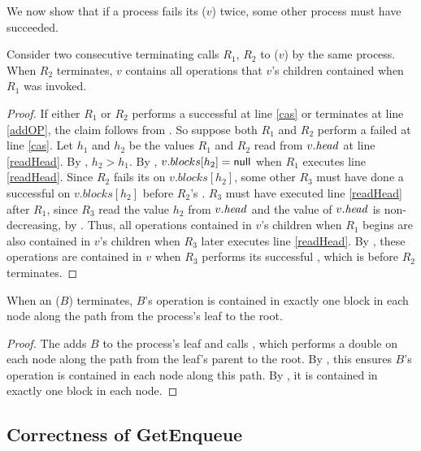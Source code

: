 We now show that if a process fails its ($v$) twice, some other process must have succeeded.

\begin{lemma}\label{lem::doubleRefresh}
Consider two consecutive terminating calls $R_1$, $R_2$ to ($v$) by the same process.
When $R_2$ terminates, $v$ contains all operations that $v$'s children contained when $R_1$ was invoked.
\end{lemma}
\begin{proof}
If either $R_1$ or $R_2$ performs a successful  at line \ref{cas} or terminates at line \ref{addOP}, the claim follows
from .
So suppose both $R_1$ and $R_2$ perform a failed  at line \ref{cas}.
Let $h_1$ and $h_2$ be the values $R_1$ and $R_2$ read from $v.\mbox{\textit{head}}$ at line \ref{readHead}.
By , $h_2>h_1$.
By , $v.blocks[h_2]=\mbox{\sf null}$ when $R_1$ executes line \ref{readHead}.
Since $R_2$ fails its  on $v.blocks[h_2]$, some other  $R_3$ must have done
a successful  on $v.blocks[h_2]$ before $R_2$'s .
$R_3$ must have executed line \ref{readHead} after $R_1$, since $R_3$ read the value $h_2$ from $v.\mbox{\textit{head}}$ and the value of $v.\mbox{\textit{head}}$ is non-decreasing, by .
Thus, all operations contained in $v$'s children when $R_1$ begins
are also contained in $v$'s children when $R_3$ later executes line \ref{readHead}.
By , these operations are contained in $v$ when $R_3$ performs its successful ,
which is before $R_2$ terminates.
\end{proof}

\begin{lemma} \label{lem::appendExactlyOnce}
When an ($B$) terminates, $B$'s operation is contained in exactly one block in each node along the path from the process's leaf to the root.
\end{lemma}
\begin{proof}
The  adds $B$ to the process's leaf and calls , which
performs a double  on each node along the path from the leaf's parent to the root.
By , this ensures $B$'s operation is contained in each node along this path.
By , it is contained in exactly one block in each node.
\end{proof}

\subsection{Correctness of GetEnqueue}

